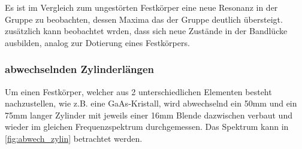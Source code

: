 \noindent
Es ist im Vergleich zum ungestörten Festkörper eine neue Resonanz in der Gruppe zu beobachten, dessen Maxima das der Gruppe deutlich übersteigt. zusätzlich kann beobachtet wrden, dass
sich neue Zustände in der Bandlücke ausbilden, analog zur Dotierung eines Festkörpers.

\subsubsection{abwechselnden Zylinderlängen}
Um einen Festkörper, welcher aus 2 unterschiedlichen Elementen besteht nachzustellen, wie z.B. eine GaAs-Kristall, wird abwechselnd ein 50mm und ein 75mm langer Zylinder
mit jeweils einer 16mm Blende dazwischen verbaut und wieder im gleichen Frequenzspektrum durchgemessen. Das Spektrum kann in \autoref{fig:abwech_zylin} betrachtet werden.

\begin{figure}[H]
    \centering
    \hfil 
    \hfil 
    \caption{}
    \label{fig:abwech_zylin}
\end{figure}

